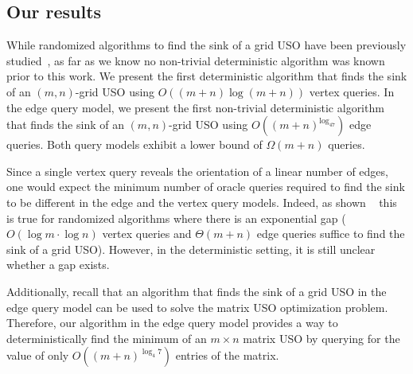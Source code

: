 \documentclass[runningheads,a4paper]{llncs}
\begin{document}



\subsection{Our results}

While randomized algorithms to find the sink of a grid USO have been previously studied~\cite{grid05,linepoint,grid08,falkthesis}, as far as we know no non-trivial deterministic algorithm was known prior to this work. 
We present the first deterministic algorithm that finds the sink of an $(m,n)$-grid USO using $O((m+n)\log (m+n))$ vertex queries.
In the edge query model, 
we present the first non-trivial deterministic algorithm that finds the sink of an $(m, n)$-grid USO using $O((m+n)^{\log_47})$ edge queries. 
Both query models exhibit a lower bound of $\Omega(m+n)$ queries.

Since a single vertex query reveals the orientation of a linear number of edges, one would expect the minimum number of  oracle queries required to find the sink to be different in the edge and the vertex query models.
Indeed, as shown ~\citet{grid08} this is true for randomized algorithms where there is an exponential gap ($O(\log m\cdot \log n)$ vertex queries and $\Theta(m+n)$ edge queries suffice to find the sink of a grid USO).
However, in the deterministic setting, it is still unclear whether a gap exists.

Additionally, recall that an algorithm that finds the sink of a grid USO in the edge query model can be used to solve the matrix USO optimization problem. 
Therefore, our algorithm in the edge query model provides a way to deterministically find the minimum of an $m\times n$ matrix USO by querying for the value of only $O((m+n)^{\log_4 7})$ entries of the matrix. 
\end{document}
